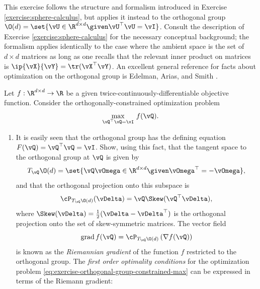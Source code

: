 \documentclass[../../book-main.tex]{subfiles}
\begin{document}
\begin{exercise}\label{exercise:orthogonal-group-calculus}
    This exercise follows the structure and formalism introduced in Exercise \ref{exercise:sphere-calculus}, but applies it instead to the orthogonal group $\O(d) = \set{\vU \in \R^{d \times d} \given \vU^\top \vU = \vI}$. 
    Consult the description of Exercise \ref{exercise:sphere-calculus} for the necessary conceptual background; the formalism applies identically to the case where the ambient space is the set of $d \times d$ matrices as long as one recalls that the relevant inner product on matrices is $\ip{\vX}{\vY} = \tr(\vX^\top \vY)$.
    An excellent general reference for facts about optimization on the orthogonal group is Edelman, Arias, and Smith \cite{Edelman1998-lg}.
    
    Let $f : \R^{d\times d} \to \R$ be a given twice-continuously-differentiable objective function. Consider the orthogonally-constrained optimization problem
    \begin{equation}\label{eq:exercise-orthogonal-group-constrained-max}
        \max_{\vQ^\top \vQ = \vI}\, f(\vQ). 
    \end{equation}
    \begin{enumerate}
        \item  It is easily seen that the orthogonal group has the defining equation $F(\vQ) = \vQ^\top \vQ = \vI$.
        Show, using this fact, that the tangent space to the orthogonal group at $\vQ$ is given by
        \begin{equation*}
            T_{\vQ} \O(d) = \set{\vQ \vOmega \in \R^{d\times d} \given \vOmega^\top = - \vOmega},
        \end{equation*}
        and that the orthogonal projection onto this subspace is 
        \begin{equation*}
        \cP_{T_{\vQ}\O(d)}(\vDelta) =  \vQ \Skew(\vQ^\top \vDelta),
        \end{equation*}
        where $\Skew(\vDelta) = \tfrac{1}{2} ( \vDelta - \vDelta^\top)$ is the orthogonal projection onto the set of skew-symmetric matrices.
        The vector field 
        \begin{equation}\label{eq:exercise-riemann-grad-orthogonal-group}
        \mathrm{grad}\, f(\vQ) = \cP_{T_{\vQ} \O(d)} \left( \nabla f(\vQ) \right)
        \end{equation}
        is known as the \textit{Riemannian gradient} of the function $f$ restricted to the orthogonal group.
        The \textit{first order optimality conditions} for the optimization problem \eqref{eq:exercise-orthogonal-group-constrained-max} can be expressed in terms of the Riemann gradient:

\end{enumerate}
\end{exercise}
\end{document}
